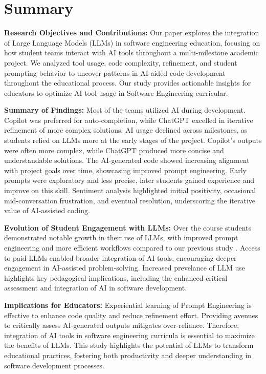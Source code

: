\section{Summary}\label{sec-con}

\textbf{Research Objectives and Contributions: }Our paper explores the integration of Large Language Models (LLMs) in software engineering education, focusing on how student teams interact with AI tools throughout a multi-milestone academic project. We analyzed tool usage, code complexity, refinement, and student prompting behavior to uncover patterns in AI-aided code development throughout the educational process. Our study provides actionable insights for educators to optimize AI tool usage in Software Engineering curricular.

\textbf{Summary of Findings: } Most of the teams utilized AI during development. Copilot was preferred for auto-completion, while ChatGPT excelled in iterative refinement of more complex solutions. AI usage declined across milestones, as students relied on LLMs more at the early stages of the project. Copilot's outputs were often more complex, while ChatGPT produced more concise and understandable solutions. The AI-generated code showed increasing alignment with project goals over time, showcasing improved prompt engineering. Early prompts were exploratory and less precise, later students gained experience and improve on this skill. Sentiment analysis highlighted initial positivity, occasional mid-conversation frustration, and eventual resolution, underscoring the iterative value of AI-assisted coding.

\textbf{Evolution of Student Engagement with LLMs: } Over the course students demonstrated notable growth in their use of LLMs, with improved prompt engineering and more efficient workflows compared to our previous study \cite{Rasnayaka2024}. Access to paid LLMs enabled broader integration of AI tools, encouraging deeper engagement in AI-assisted problem-solving. Increased prevelance of LLM use highlights key pedagogical implications, including the enhanced critical assessment and integration of AI in software development.

\textbf{Implications for Educators: } Experiential learning of Prompt Engineering is effective to enhance code quality and reduce refinement effort. Providing avenues to critically assess AI-generated outputs mitigates over-reliance. Therefore, integration of AI tools in software engineering curricula is essential to maximize the benefits of LLMs. This study highlights the potential of LLMs to transform educational practices, fostering both productivity and deeper understanding in software development processes.
